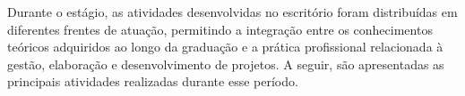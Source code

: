 Durante o estágio, as atividades desenvolvidas no escritório foram distribuídas em diferentes frentes de atuação, permitindo a integração entre os conhecimentos teóricos adquiridos ao longo da graduação e a prática profissional relacionada à gestão, elaboração e desenvolvimento de projetos. A seguir, são apresentadas as principais atividades realizadas durante esse período.

